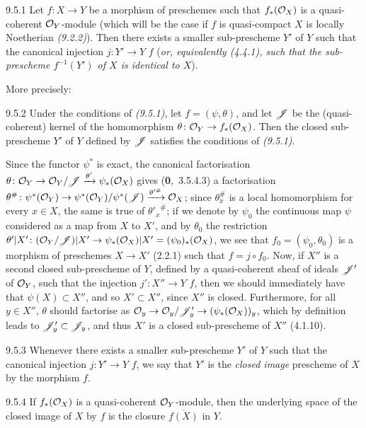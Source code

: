 \documentclass[../main.tex]{subfiles}
\begin{document}
\begin{cx}[Proposition]{9.5.1}
    Let $f\colon X\to Y$ be a morphism of preschemes such that $f_*(\mathcal{O}_X)$ is a quasi-coherent $\mathcal{O}_Y$-module (which will be the case if $f$ is quasi-compact  $X$ is locally Noetherian \emph{(9.2.2)}).
    Then there exists a smaller sub-prescheme $Y'$ of $Y$ such that the canonical injection $j\colon Y'\to Y$  $f$ (\emph{or, equivalently (4.4.1), such that the sub-prescheme $f^{-1}(Y')$ of $X$ is \emph{identical} to $X$}).
\end{cx}

More precisely:

\begin{cx}[Corollary]{9.5.2}
    Under the conditions of \emph{(9.5.1)}, let $f=(\psi,\theta)$, and let $\mathscr{J}$ be the (quasi-coherent) kernel of the homomorphism $\theta\colon\mathcal{O}_Y\to f_*(\mathcal{O}_X)$.
    Then the closed sub-prescheme $Y'$ of $Y$ defined by $\mathscr{J}$ satisfies the conditions of \emph{(9.5.1)}.
\end{cx}

Since the functor $\psi^*$ is exact, the canonical factorisation $\theta\colon\mathcal{O}_Y\to\mathcal{O}_Y/\mathscr{J}\xrightarrow{\theta'}\psi_*(\mathcal{O}_X)$ gives (\textbf{0},~3.5.4.3) a factorisation $\theta^\#\colon\psi^*(\mathcal{O}_Y)\to\psi^*(\mathcal{O}_Y)/\psi^*(\mathscr{J})\xrightarrow{\theta'^\#}\mathcal{O}_X$; since $\theta_x^\#$ is a local homomorphism for every $x\in X$, the same is true of ${\theta'_x}^\#$; if we denote by $\psi_0$ the continuous map $\psi$ considered as a map from $X$ to $X'$, and by $\theta_0$ the restriction $\theta'|X'\colon(\mathcal{O}_Y/\mathscr{J})|X'\to\psi_*(\mathcal{O}_X)|X'=(\psi_0)_*(\mathcal{O}_X)$, we see that $f_0=(\psi_0,\theta_0)$ is a morphism of preschemes $X\to X'$ (2.2.1) such that $f=j\circ f_0$.
Now, if $X''$ is a second closed sub-prescheme of $Y$, defined by a quasi-coherent sheaf of ideals $\mathscr{J}'$ of $\mathcal{O}_Y$, such that the injection $j'\colon X''\to Y$  $f$, then we should immediately have that $\psi(X)\subset X''$, and so $X'\subset X''$, since $X''$ is closed.
Furthermore, for all $y\in X''$, $\theta$ should factorise as $\mathcal{O}_y\to\mathcal{O}_y/\mathscr{J}'_y\to(\psi_*(\mathcal{O}_X))_y$, which by definition leads to $\mathscr{J}'_y\subset\mathscr{J}_y$, and thus $X'$ is a closed sub-prescheme of $X''$ (4.1.10).

\begin{cx}[Definition]{9.5.3}
    Whenever there exists a smaller sub-prescheme $Y'$ of $Y$ such that the canonical injection $j\colon Y'\to Y$  $f$, we say that $Y'$ is the \emph{closed image} prescheme of $X$ by the morphism $f$.
\end{cx}

\begin{cx}[Proposition]{9.5.4}
    If $f_*(\mathcal{O}_X)$ is a quasi-coherent $\mathcal{O}_Y$-module, then the underlying space of the closed image of $X$ by $f$ is the closure $\overline{f(X)}$ in $Y$.
\end{cx}
\end{document}
